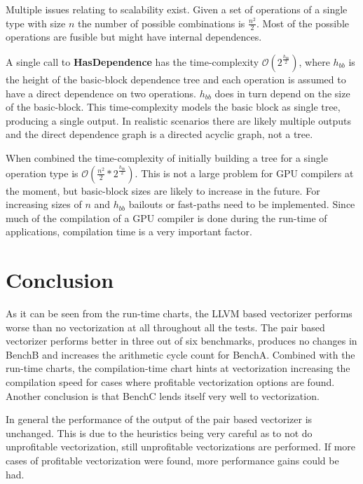 \documentclass[12pt,a4paper,onecolumn,twoside,openright]{report}
\begin{document}
Multiple issues relating to scalability exist. Given a set of operations of a single type with size $n$ the number of possible combinations is $\frac{n^2}{2}$. Most of the possible operations are fusible but might have internal dependences.

A single call to \textbf{HasDependence} has the time-complexity $\mathcal{O}(2^\frac{{h_{bb}}}{2})$, where $h_{bb}$ is the height of the basic-block dependence tree and each operation is assumed to have a direct dependence on two operations. $h_{bb}$ does in turn depend on the size of the basic-block. This time-complexity models the basic block as single tree, producing a single output. In realistic scenarios there are likely multiple outputs and the direct dependence graph is a directed acyclic graph, not a tree.

When combined the time-complexity of initially building a tree for a single operation type is $\mathcal{O}(\frac{n^2}{2}*2^\frac{{h_{bb}}}{2})$. This is not a large problem for GPU compilers at the moment, but basic-block sizes are likely to increase in the future. For increasing sizes of $n$ and $h_{bb}$ bailouts or fast-paths need to be implemented. Since much of the compilation of a GPU compiler is done during the run-time of applications, compilation time is a very important factor.




\chapter{Conclusion}
 \label{chap:conclusion}

As it can be seen from the run-time charts, the LLVM based vectorizer performs worse than no vectorization at all throughout all the tests. The pair based vectorizer performs better in three out of six benchmarks, produces no changes in BenchB and increases the arithmetic cycle count for BenchA.
Combined with the run-time charts, the compilation-time chart hints at vectorization increasing the compilation speed for cases where profitable vectorization options are found.
Another conclusion is that BenchC lends itself very well to vectorization.

In general the performance of the output of the pair based vectorizer is unchanged. This is due to the heuristics being very careful as to not do unprofitable vectorization, still unprofitable vectorizations are performed. If more cases of profitable vectorization were found, more performance gains could be had.
\end{document}
